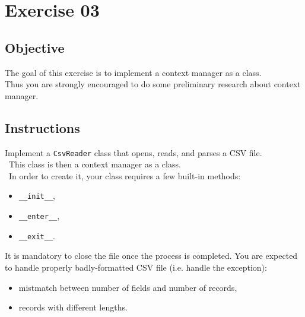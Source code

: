 \chapter{Exercise 03}
\makeheaderfilesforbidden

\section*{Objective}
The goal of this exercise is to implement a context manager as a class.\\
Thus you are strongly encouraged to do some preliminary research about context manager.\\

\section*{Instructions}
Implement a \texttt{CsvReader} class that opens, reads, and parses a CSV file.\\
\
This class is then a context manager as a class.\\
\
In order to create it, your class requires a few built-in methods:
\begin{itemize}
  \item \texttt{\_\_init\_\_},
  \item \texttt{\_\_enter\_\_},
  \item \texttt{\_\_exit\_\_}.
\end{itemize}
It is mandatory to close the file once the process is completed.
You are expected to handle properly badly-formatted CSV file (i.e. handle the exception):

\begin{itemize}
  \item mistmatch between number of fields and number of records,
  \item records with different lengths.
\end{itemize}

